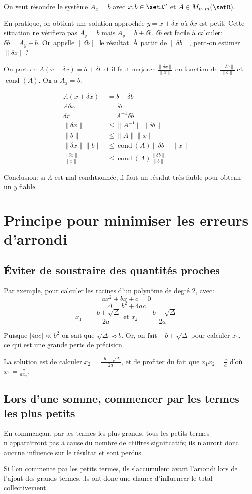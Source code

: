 \documentclass[a4paper,10pt,french,openany]{memoir}
\newcommand{\norm}[1]{\lVert#1\rVert}
\newcommand{\normfrac}[2]{\frac{\norm{#1}}{\norm{#2}}}
\DeclareMathOperator{\cond}{cond}
\begin{document}
On veut résoudre le système $A_x = b$ avec $x, b \in \setR^n$ et $A \in M_{m,m}(\setR)$.

En pratique, on obtient une solution approchée $y = x + \delta x$ où $\delta x$ est petit. Cette situation ne vérifiera pas $A_y = b$ mais $A_y = b + \delta b$. $\delta b$ est facile à calculer: $\delta b = A_y - b$. On appelle $\norm{\delta b}$ le résultat. À partir de $\norm{\delta b}$, peut-on estimer $\norm{\delta x}$?

On part de $A(x+\delta x) = b + \delta b$ et il faut majorer $\normfrac{\delta x}{x}$ en fonction de $\normfrac{\delta b}{b}$ et $\cond(A)$. On a $A_x = b$.

\begin{align*}
  A(x+\delta x) &= b+\delta b \\
  A\delta x &= \delta b \\
  \delta x &= A^{-1} \delta b \\
  \norm{\delta x} &\leq \norm{A^{-1}} \norm{\delta b} \\
  \norm{b} &\leq \norm{A} \norm{x} \\
  \norm{\delta x} \norm{b} &\leq \cond(A) \norm{\delta b} \norm{x} \\
  \normfrac{\delta x}{x} &\leq \cond(A) \normfrac{\delta b}{b}
\end{align*}

Conclusion: si $A$ est mal conditionnée, il faut un résidut très faible pour obtenir un $y$ fiable.

\section{Principe pour minimiser les erreurs d'arrondi}

\subsection{Éviter de soustraire des quantités proches}

Par exemple, pour calculer les racines d'un polynôme de degré 2, avec:
\[a x^2 + b x + c = 0\]
\[\Delta = b^2 + 4 a c\]
\[x_1 = \frac{-b+\sqrt{\Delta}}{2 a} \text{ et } x_2 = \frac{-b-\sqrt{\Delta}}{2 a}\]

Puisque $\left|4 a c\right| \ll b^2$ on sait que $\sqrt{\Delta} \approx b$. Or, on fait $-b+\sqrt{\Delta}$ pour calculer $x_1$, ce qui est une grande perte de précision.

La solution est de calculer $x_2 = \frac{-b-\sqrt{\Delta}}{2 a}$, et de profiter du fait que $x_1 x_2 = \frac c a$ d'où $x_1 = \frac c {a x_2}$.

\subsection{Lors d'une somme, commencer par les termes les plus petits}

En commençant par les termes les plus grands, tous les petits termes n'apparaîtront pas à cause du nombre de chiffres significatifs; ils n'auront donc aucune influence sur le résultat et sont perdus.

Si l'on commence par les petits termes, ils s'accumulent avant l'arrondi lors de l'ajout des grands termes, ils ont donc une chance d'influencer le total collectivement.
\end{document}
